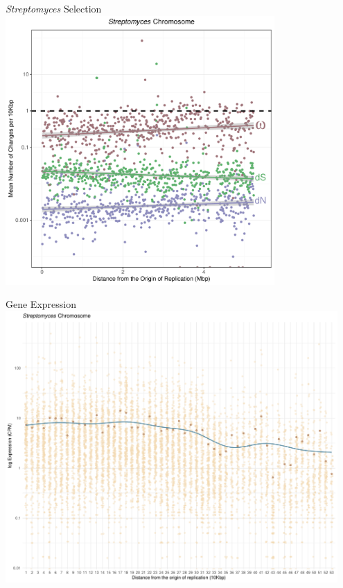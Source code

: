 \documentclass{beamer}
\newcommand{\strep}{\textit{Streptomyces}\xspace}
\begin{document}
\begin{frame}{\strep Selection}
	\centering
	\includegraphics[width=0.77\textwidth]{strep_selection.pdf}
\end{frame}
\begin{frame}{Gene Expression}
	\centering
	\includegraphics[width=0.95\textwidth]{strep_expression_plot.pdf}
\end{frame}
\end{document}
